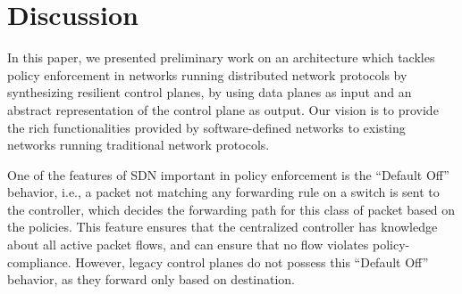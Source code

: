 \section{Discussion}
In this paper, we presented preliminary work on an
architecture which 
tackles policy enforcement in networks running distributed 
network protocols by synthesizing resilient control planes,
by using data planes as input and an abstract representation
of the control plane as output. Our vision
is to provide the rich functionalities provided by 
software-defined networks to existing 
networks running traditional network
protocols. 

One of the features of SDN important in policy 
enforcement is the ``Default Off'' behavior, i.e.,
a packet not matching any forwarding rule on a switch
is sent to the controller, which 
decides the forwarding path for this class of packet
based on the policies. This feature ensures that the
centralized controller has knowledge about all active 
packet flows, and can ensure that no flow violates 
policy-compliance. However, legacy control planes 
do not possess this ``Default Off'' behavior, as they 
forward only based on destination. 
